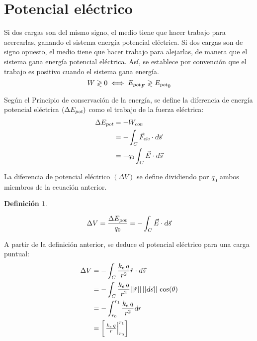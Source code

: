 \documentclass[a5paper,12pt,twoside]{book}
\newtheorem{defn}{{Definición}}[chapter]
\begin{document}
\section{Potencial eléctrico}

Si dos cargas son del mismo signo, el medio tiene que hacer trabajo para acercarlas, ganando el sistema energía potencial eléctrica. Si dos cargas son de signo opuesto, el medio tiene que hacer trabajo para alejarlas, de manera que el sistema gana energía potencial eléctrica. Así, se establece por convención que el trabajo es positivo cuando el sistema gana energía.
\begin{equation*}
    W \gtrless 0 \iff {{{E}_\textsl{{pot}}}}_F \gtrless {{{E}_\textsl{{pot}}}}_0
\end{equation*}

Según el Principio de conservación de la energía, se define la diferencia de energía potencial eléctrica $(\Delta {{E}_\textsl{{pot}}})$ como el trabajo de la fuerza eléctrica:
\begin{align*}
    \Delta {{E}_\textsl{{pot}}} &= - {{W}_\textsl{{con}}}
    \\
    &= - \int_C {{\Vec{F}}_\textsl{{ele}}} \cdot \textsl{d} \Vec{s}
    \\
    &= - q_0 \int_C \Vec{E} \cdot \textsl{d} \Vec{s}
\end{align*}

La diferencia de potencial eléctrico $(\Delta V)$ se define dividiendo por $q_0$ ambos miembros de la ecuación anterior.

\begin{mdframed}[style=MyFrame1]
    \begin{defn}
        \label{defn:potEle}
    \end{defn}
    \begin{equation*}
        \Delta V = \frac{\Delta {{E}_\textsl{{pot}}}}{q_0} = - \int_C \Vec{E} \cdot \textsl{d} \Vec{s}
    \end{equation*}
\end{mdframed}

A partir de la definición anterior, se deduce el potencial eléctrico para una carga puntual:
\begin{align*}
    \Delta V &= - \int_C \frac{k_e \, q}{r^2} \hat{r} \cdot \textsl{d} \Vec{s}
    \\
    &= - \int_C \frac{k_e \, q}{r^2} {\left|\left| {\hat{r}} \right|\right|} \, {\left|\left| {\textsl{d} \Vec{s}} \right|\right|} \, \cos(\theta)
    \\
    &= - \int_{r_0}^{r_1} \frac{k_e \, q}{r^2} \textsl{d} r
    \\
    &= \begin{bmatrix} \left. \frac{k_e \, q}{r} \right|_{r_0}^{r_1} \end{bmatrix}
\end{align*}
\end{document}
